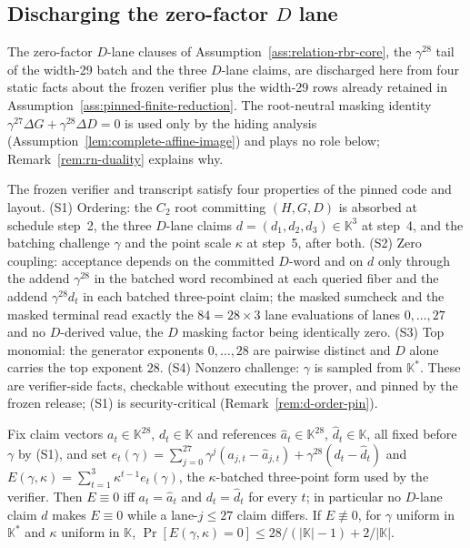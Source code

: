 \subsection{Discharging the zero-factor \texorpdfstring{$D$}{D} lane}
\label{sec:d-lane-discharge}

The zero-factor \(D\)-lane clauses of
Assumption~\ref{ass:relation-rbr-core}, the \(\gamma^{28}\) tail of the
width-29 batch and the three \(D\)-lane claims, are discharged here from four
static facts about the frozen verifier plus the width-29 rows already retained
in Assumption~\ref{ass:pinned-finite-reduction}.  The root-neutral masking
identity \(\gamma^{27}\Delta G+\gamma^{28}\Delta D=0\) is used only by the
hiding analysis (Assumption~\ref{lem:complete-affine-image}) and plays no role
below; Remark~\ref{rem:rn-duality} explains why.

\begin{definition}
\label{def:d-coupling}
The frozen verifier and transcript satisfy four properties of the pinned code
and layout.  \textup{(S1) Ordering:} the \(C_2\) root committing \((H,G,D)\) is
absorbed at schedule step~2, the three \(D\)-lane claims
\(d=(d_1,d_2,d_3)\in\mathbb K^3\) at step~4, and the batching challenge
\(\gamma\) and the point scale \(\kappa\) at step~5, after both.
\textup{(S2) Zero coupling:} acceptance depends on the committed \(D\)-word and
on \(d\) only through the addend \(\gamma^{28}\) in the batched word recombined
at each queried fiber and the addend \(\gamma^{28}d_t\) in each batched
three-point claim; the masked sumcheck and the masked terminal read exactly the
\(84=28\times3\) lane evaluations of lanes \(0,\dots,27\) and no \(D\)-derived
value, the \(D\) masking factor being identically zero.  \textup{(S3) Top
monomial:} the generator exponents \(0,\dots,28\) are pairwise distinct and
\(D\) alone carries the top exponent \(28\).  \textup{(S4) Nonzero challenge:}
\(\gamma\) is sampled from \(\mathbb K^{*}\).  These are verifier-side facts,
checkable without executing the prover, and pinned by the frozen release; (S1)
is security-critical (Remark~\ref{rem:d-order-pin}).
\end{definition}

\begin{lemma}
\label{lem:d-monomial-separation}
Fix claim vectors \(a_t\in\mathbb K^{28}\), \(d_t\in\mathbb K\) and references
\(\hat a_t\in\mathbb K^{28}\), \(\hat d_t\in\mathbb K\), all fixed before
\(\gamma\) by \textup{(S1)}, and set
\(e_t(\gamma)=\sum_{j=0}^{27}\gamma^{j}(a_{j,t}-\hat a_{j,t})
+\gamma^{28}(d_t-\hat d_t)\) and
\(E(\gamma,\kappa)=\sum_{t=1}^{3}\kappa^{t-1}e_t(\gamma)\), the
\(\kappa\)-batched three-point form used by the verifier.  Then \(E\equiv0\) iff
\(a_t=\hat a_t\) and \(d_t=\hat d_t\) for every \(t\); in particular no
\(D\)-lane claim \(d\) makes \(E\equiv0\) while a lane-\(j\le27\) claim differs.
If \(E\not\equiv0\), for \(\gamma\) uniform in \(\mathbb K^{*}\) and \(\kappa\)
uniform in \(\mathbb K\),
\(\Pr[E(\gamma,\kappa)=0]\le 28/(|\mathbb K|-1)+2/|\mathbb K|\).
\end{lemma}

